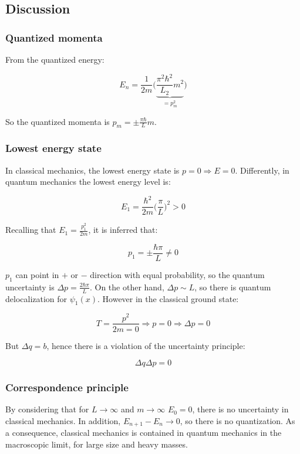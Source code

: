   \subsection{Discussion}

    \subsubsection{Quantized momenta}
    From the quantized energy:

    $$E_n = \frac{1}{2m}\biggl(\underbrace{\frac{\pi^2\hbar^2}{L_2}m^2}_{=p_m^2}\biggr)$$

    So the quantized momenta is $p_m = \pm \frac{\pi\hbar}{L}m$.

    \subsubsection{Lowest energy state}
    In classical mechanics, the lowest energy state is $p = 0\Rightarrow E = 0$.
    Differently, in quantum mechanics the lowest energy level is:

    $$E_1 = \frac{\hbar^2}{2m}\biggl(\frac{\pi}{L}\biggr)^2 > 0$$

    Recalling that $E_1 = \frac{p_1^2}{2m}$, it is inferred that:

    $$p_1 = \pm \frac{\hbar\pi}{L}\neq 0$$

    $p_1$ can point in $+$ or $-$ direction with equal probability, so the quantum uncertainty is $\Delta p =\frac{2\hbar\pi}{L}$.
    On the other hand, $\Delta p \sim L$, so there is quantum delocalization for $\psi_1(x)$.
    However in the classical ground state:

    $$T = \frac{p^2}{2m = 0}\Rightarrow p = 0\Rightarrow \Delta p = 0$$

    But $\Delta q = b$, hence there is a violation of the uncertainty principle:

    $$\Delta q\Delta p = 0$$

    \subsubsection{Correspondence principle}
    By considering that for $L\rightarrow\infty$ and $m\rightarrow\infty$ $E_0 = 0$, there is no uncertainty in classical mechanics. In addition, $E_{n+1}-E_n \rightarrow 0$, so there is no quantization.
    As a consequence, classical mechanics is contained in quantum mechanics in the macroscopic limit, for large size and heavy masses.

